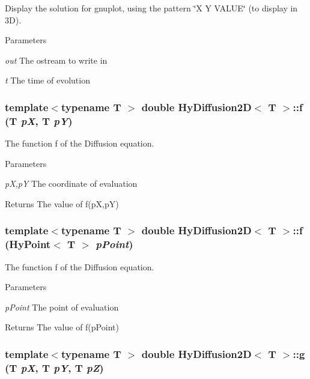Display the solution for gnuplot, using the pattern \char`\"{}X Y VALUE\char`\"{} (to display in 3D). 


\begin{DoxyParams}{Parameters}
\item[{\em out}]The ostream to write in \item[{\em t}]The time of evolution \end{DoxyParams}
\hypertarget{classHyDiffusion2D_aea84648a2e7b70f9eda67ef603102a11}{
\subsubsection[{f}]{\setlength{\rightskip}{0pt plus 5cm}template$<$typename T $>$ double {\bf HyDiffusion2D}$<$ T $>$::f (T {\em pX}, \/  T {\em pY})}}
\label{classHyDiffusion2D_aea84648a2e7b70f9eda67ef603102a11}


The function f of the Diffusion equation. 


\begin{DoxyParams}{Parameters}
\item[{\em pX,pY}]The coordinate of evaluation \end{DoxyParams}
\begin{DoxyReturn}{Returns}
The value of f(pX,pY) 
\end{DoxyReturn}
\hypertarget{classHyDiffusion2D_a40c7ec43e3b5e0d1d1d518dabd3a2299}{
\subsubsection[{f}]{\setlength{\rightskip}{0pt plus 5cm}template$<$typename T $>$ double {\bf HyDiffusion2D}$<$ T $>$::f ({\bf HyPoint}$<$ T $>$ {\em pPoint})}}
\label{classHyDiffusion2D_a40c7ec43e3b5e0d1d1d518dabd3a2299}


The function f of the Diffusion equation. 


\begin{DoxyParams}{Parameters}
\item[{\em pPoint}]The point of evaluation \end{DoxyParams}
\begin{DoxyReturn}{Returns}
The value of f(pPoint) 
\end{DoxyReturn}
\hypertarget{classHyDiffusion2D_ae09f11a685b241e42b466d023b1d23fc}{
\subsubsection[{g}]{\setlength{\rightskip}{0pt plus 5cm}template$<$typename T $>$ double {\bf HyDiffusion2D}$<$ T $>$::g (T {\em pX}, \/  T {\em pY}, \/  T {\em pZ})}}
\label{classHyDiffusion2D_ae09f11a685b241e42b466d023b1d23fc}


